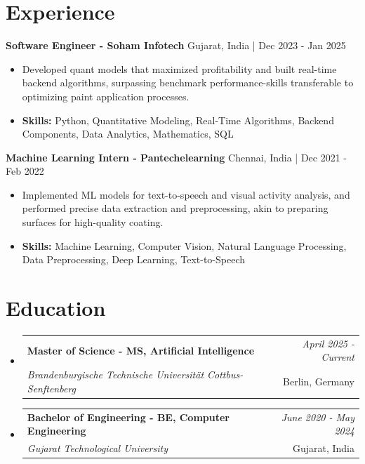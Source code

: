 \documentclass[a4paper,11pt]{article}
\makeatletter
\newcommand{\resumeSubheading}[4]{
\vspace{0.5mm}\item
    \begin{tabular*}{\linewidth}[t]{l@{\extracolsep{\fill}}r}
        \textbf{#1} & \textit{\footnotesize{#4}} \\
        \textit{\footnotesize{#3}} &  \footnotesize{#2}\\
    \end{tabular*}
    \vspace{-2.4mm}
}
\makeatother
\begin{document}
\section{\textbf{Experience}}


\vspace{1mm}
  \textbf{Software Engineer - Soham Infotech} \hfill Gujarat, India | Dec 2023 - Jan 2025
\vspace{-1.5mm} %
\begin{itemize}
  \item Developed quant models that maximized profitability and built real-time backend algorithms, surpassing benchmark performance-skills transferable to optimizing paint application processes.

\vspace{-2mm}
  \item \textbf{Skills:} Python, Quantitative Modeling, Real-Time Algorithms, Backend Components, Data Analytics, Mathematics, SQL
\end{itemize}

\vspace{1mm}
  \textbf{Machine Learning Intern - Pantechelearning} \hfill Chennai, India | Dec 2021 - Feb 2022
\vspace{-1.5mm} %
\begin{itemize}
  \item Implemented ML models for text-to-speech and visual activity analysis, and performed precise data extraction and preprocessing, akin to preparing surfaces for high-quality coating.
\vspace{-2mm}
  \item \textbf{Skills:} Machine Learning, Computer Vision, Natural Language Processing, Data Preprocessing, Deep Learning, Text-to-Speech
\end{itemize}\section{\textbf{Education}}
\vspace{-0.4mm}

\begin{itemize}[leftmargin=0.15in, label={}]
\resumeSubheading
{Master of Science - MS, Artificial Intelligence }{Berlin, Germany}
{Brandenburgische Technische Universität Cottbus-Senftenberg  }{April 2025 - Current}

\vspace{1.0mm} %
\resumeSubheading
{Bachelor of Engineering - BE, Computer Engineering  }{Gujarat, India}
{Gujarat Technological University }{June 2020 - May 2024}

\end{itemize}
\end{document}
